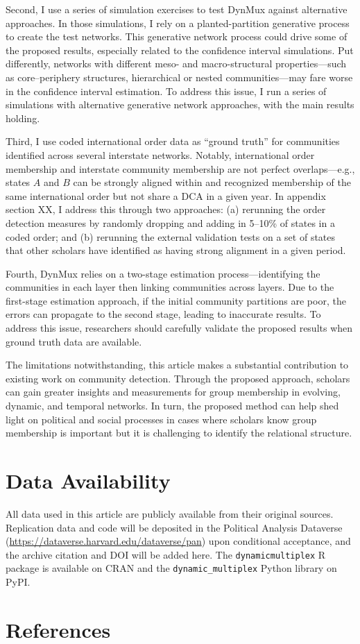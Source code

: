 \documentclass[11pt, letterpaper]{article}
\begin{document}
Second, I use a series of simulation exercises to test DynMux  against alternative approaches. In those simulations, I rely on a planted-partition generative process to create the test networks. This generative network process could drive some of the proposed results, especially related to the confidence interval simulations. Put differently, networks with different meso- and macro-structural properties---such as core–periphery structures, hierarchical or nested communities---may fare worse in the confidence interval estimation. To address this issue, I run a series of simulations with alternative generative network approaches, with the main results holding.

Third, I use coded international order data as ``ground truth'' for communities identified across several interstate networks. Notably, international order membership and interstate community membership are not perfect overlaps---e.g., states $A$ and $B$ can be strongly aligned within and recognized membership of the same international order but not share a DCA in a given year. In appendix section XX, I address this through two approaches: (a) rerunning the order detection measures by randomly dropping and adding in 5--10\% of states in a coded order; and (b) rerunning the external validation tests on a set of states that other scholars have identified as having strong alignment in a given period. 

Fourth, DynMux relies on a two-stage estimation process---identifying the communities in each layer then linking communities across layers. Due to the first-stage estimation approach, if the initial community partitions are poor, the errors can propagate to the second stage, leading to inaccurate results. To address this issue, researchers should carefully validate the proposed results when ground truth data are available. 

The limitations notwithstanding, this article makes a substantial contribution to existing work on community detection. Through the proposed approach, scholars can gain greater insights and measurements for group membership in evolving, dynamic, and temporal networks. In turn, the proposed method can help shed light on political and social processes in cases where scholars know group membership is important but it is challenging to identify the relational structure. 

\section*{Data Availability}
All data used in this article are publicly available from their original sources. Replication data and code will be deposited in the Political Analysis Dataverse (\url{https://dataverse.harvard.edu/dataverse/pan})
upon conditional acceptance, and the archive citation and DOI will be added here. The \texttt{dynamicmultiplex} R package is available on CRAN and the \texttt{dynamic\_multiplex} Python library on PyPI.

\section*{References}

\doublespacing



\end{document}

